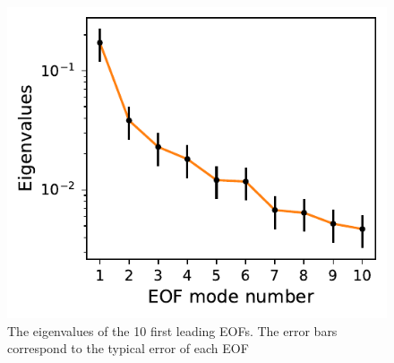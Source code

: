 \begin{figure}[htbp]
    \centering
    \includegraphics[scale=0.8]{texfiles/figs/EOF_north_test.pdf}
    \caption{The eigenvalues of the 10 first leading EOFs. The error bars correspond to the typical error of each EOF}
    \label{fig:eof_test}
\end{figure}


